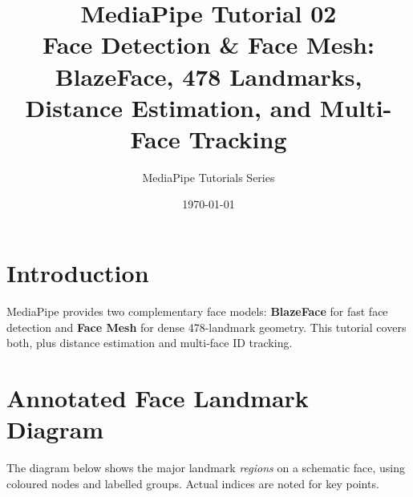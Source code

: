 \documentclass[12pt,a4paper]{article}
\begin{document}
\title{\textbf{\textcolor{mpblue}{MediaPipe Tutorial 02}}\\[0.4em]
    \large Face Detection \& Face Mesh: BlazeFace, 478 Landmarks,\\
    Distance Estimation, and Multi-Face Tracking}
\author{MediaPipe Tutorials Series}
\date{\today}
\maketitle
\tableofcontents
\newpage

\section{Introduction}

MediaPipe provides two complementary face models: \textbf{BlazeFace} for fast face
detection and \textbf{Face Mesh} for dense 478-landmark geometry. This tutorial covers both,
plus distance estimation and multi-face ID tracking.

\section{Annotated Face Landmark Diagram}

The diagram below shows the major landmark \emph{regions} on a schematic face,
using coloured nodes and labelled groups. Actual indices are noted for key points.

\bigskip
\end{document}
